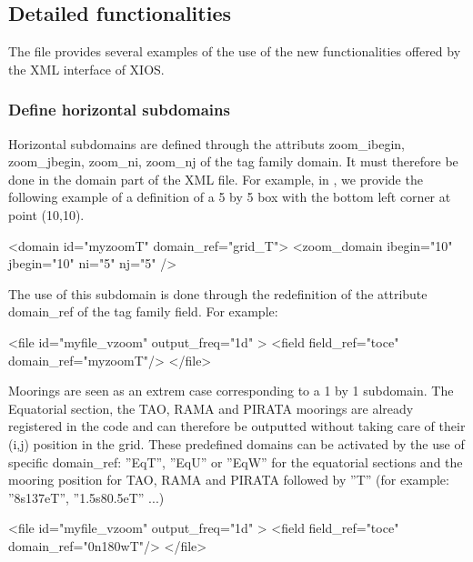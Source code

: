 \documentclass[../main/NEMO_manual]{subfiles}
\begin{document}
\subsection{Detailed functionalities}

The file  provides several examples of the use of
the new functionalities offered by the XML interface of XIOS.

\subsubsection{Define horizontal subdomains}

Horizontal subdomains are defined through the attributs zoom\_ibegin, zoom\_jbegin, zoom\_ni, zoom\_nj of
the tag family domain.
It must therefore be done in the domain part of the XML file.
For example, in , we provide the following example of a definition of
a 5 by 5 box with the bottom left corner at point (10,10).

\begin{xmllines}
<domain id="myzoomT" domain_ref="grid_T">
	<zoom_domain ibegin="10" jbegin="10" ni="5" nj="5" />
\end{xmllines}

The use of this subdomain is done through the redefinition of the attribute domain\_ref of the tag family field.
For example:

\begin{xmllines}
<file id="myfile_vzoom" output_freq="1d" >
	<field field_ref="toce" domain_ref="myzoomT"/>
</file>
\end{xmllines}

Moorings are seen as an extrem case corresponding to a 1 by 1 subdomain.
The Equatorial section, the TAO, RAMA and PIRATA moorings are already registered in the code and
can therefore be outputted without taking care of their (i,j) position in the grid.
These predefined domains can be activated by the use of specific domain\_ref:
''EqT'', ''EqU'' or ''EqW'' for the equatorial sections and
the mooring position for TAO, RAMA and PIRATA followed by ''T'' (for example: ''8s137eT'', ''1.5s80.5eT'' ...)

\begin{xmllines}
<file id="myfile_vzoom" output_freq="1d" >
	<field field_ref="toce" domain_ref="0n180wT"/>
</file>
\end{xmllines}
\end{document}
